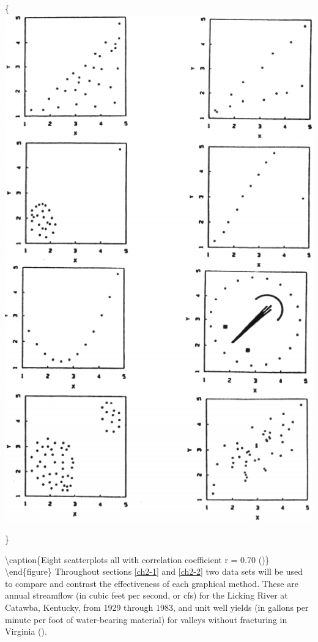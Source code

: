 \documentclass[]{book}
\begin{document}
\{\centering \includegraphics[width=7.11in]{figures/2_1}

\}

\textbackslash{}caption\{Eight scatterplots all with correlation coefficient r = 0.70 (\citet{chambers_graphical_1983})\}\label{fig:fig-2-1}
\textbackslash{}end\{figure\}
Throughout sections \ref{ch2-1} and \ref{ch2-2} two data sets will be used to compare and contrast the effectiveness of each graphical method. These are annual streamflow (in cubic feet per second, or cfs) for the Licking River at Catawba, Kentucky, from 1929 through 1983, and unit well yields (in gallons per minute per foot of water-bearing material) for valleys without fracturing in
Virginia (\citet{wright_effects_1985}).
\end{document}
